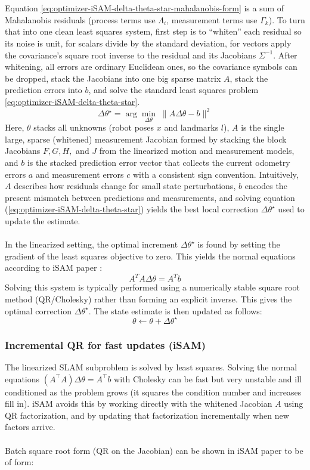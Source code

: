 \\ \\
Equation \eqref{eq:optimizer-iSAM-delta-theta-star-mahalanobis-form} is a sum of Mahalanobis residuals (process terms use $\Lambda_i$, measurement terms use $\Gamma_k$). To turn that into one clean least squares system, first step is to ``whiten'' each residual so its noise is unit, for scalars divide by the standard deviation, for vectors apply the covariance's square root inverse to the residual and its Jacobians $\Sigma^{-1}$. After whitening, all errors are ordinary Euclidean ones, so the covariance symbols can be dropped, stack the Jacobians into one big sparse matrix $A$, stack the prediction errors into $b$, and solve the standard least squares problem \eqref{eq:optimizer-iSAM-delta-theta-star}.
\begin{equation}
    \Delta\theta^\star = \arg\min_{\Delta\theta}\; \|A\Delta\theta - b\|^2
    \label{eq:optimizer-iSAM-delta-theta-star}
\end{equation}
Here, $\theta$ stacks all unknowns (robot poses $x$ and landmarks $l$), $A$ is the single large, sparse (whitened) measurement Jacobian formed by stacking the block Jacobians $F, G, H,$ and $J$ from the linearized motion and measurement models, and $b$ is the stacked prediction error vector that collects the current odometry errors $a$ and measurement errors $c$ with a consistent sign convention. Intuitively, $A$ describes how residuals change for small state perturbations, $b$ encodes the present mismatch between predictions and measurements, and solving equation (\ref{eq:optimizer-iSAM-delta-theta-star}) yields the best local correction $\Delta\theta^\star$ used to update the estimate.
\\ \\
In the linearized setting, the optimal increment $\Delta\theta^\star$ is found by setting the gradient of the least squares objective to zero. This yields the normal equations according to iSAM paper \cite{iSAM_paper}:
$$
    A^{T}A\Delta\theta = A^{T}b
$$
Solving this system is typically performed using a numerically stable square root method (QR/Cholesky) rather than forming an explicit inverse. This gives the optimal correction $\Delta\theta^\star$. The state estimate is then updated as follows:
$$
    \theta \leftarrow \theta + \Delta\theta^\star
$$



\subsubsection{Incremental QR for fast updates (iSAM)}
The linearized SLAM subproblem is solved by least squares. Solving the normal equations $(A^\top A)\Delta\theta = A^\top b$ with Cholesky can be fast but very unstable and ill conditioned as the problem grows (it squares the condition number and increases fill in). iSAM avoids this by working directly with the whitened Jacobian $A$ using QR factorization, and by updating that factorization incrementally when new factors arrive.
\\ \\
Batch square root form (QR on the Jacobian) can be shown in iSAM paper \cite{iSAM_paper} to be of form:


